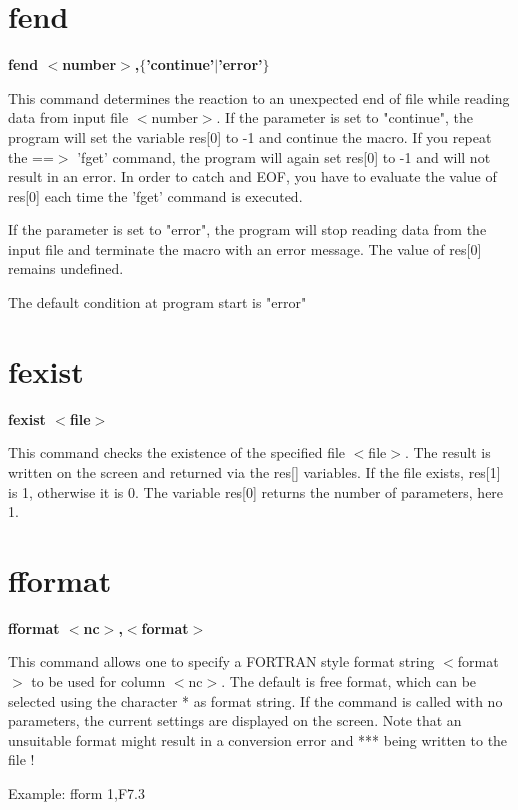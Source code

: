 \section{fend}
{\bf fend $ <$number$> $,$ \{$'continue'$| $'error'$\} $ \par }
\par
\vspace{3pt}
This command determines the reaction to an unexpected end of file 
while reading data from input file $ <$number$> $. 
If the parameter is set to "continue", the program will set the variable 
res[0] to -1 and continue the macro. If you repeat the  ==$> $ 'fget' 
command, the program will again set res[0] to -1 and will not result 
in an error. In order to catch and EOF, you have to evaluate the 
value of res[0] each time the 'fget' command is executed. 
\par
If the parameter is set to "error", the program will stop reading 
data from the input file and terminate the macro with an error 
message. The value of res[0] remains undefined. 
\par
The default condition at program start is "error" 
\section{fexist}
{\bf fexist $ <$file$> $ \par }
\par
\vspace{3pt}
This command checks the existence of the specified file $ <$file$> $. The 
result is written on the screen and returned via the res[] variables. 
If the file exists, res[1] is 1, otherwise it is 0. The variable 
res[0] returns the number of parameters, here 1. 
\section{fformat}
{\bf fformat $ <$nc$> $,$ <$format$> $ \par }
\par
\vspace{3pt}
This command allows one to specify a FORTRAN style format string 
$ <$format$> $ to be used for column $ <$nc$> $. The default is free format, 
which can be selected using the character * as format string. If 
the command is called with no parameters, the current settings are 
displayed on the screen. Note that an unsuitable format might 
result in a conversion error and *** being written to the file ! 
\par
\begin{MacVerbatim}
Example: fform 1,F7.3
\end{MacVerbatim}
